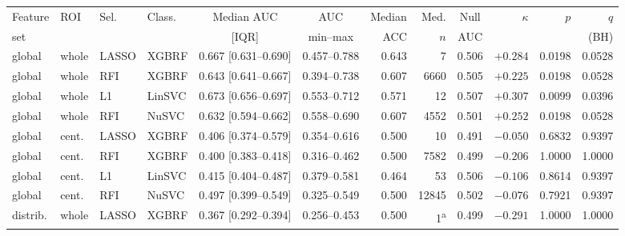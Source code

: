 {\tiny\setlength{\tabcolsep}{3pt}%
\begin{tabular}{llllccrrcrrr}
\toprule
Feature & ROI & Sel. & Class. & Median AUC & AUC & Median & Med. & Null & $\kappa$ & $p$ & $q$ \\
set &  &  &  & [IQR] & min--max & ACC & $n$ & AUC &  &  & (BH) \\
\midrule
global                   & whole & LASSO & XGBRF  & 0.667 [0.631--0.690] & 0.457--0.788 & 0.643 & 7                    & 0.506 & $+0.284$ & 0.0198 & 0.0528 \\
global                   & whole & RFI   & XGBRF  & 0.643 [0.641--0.667] & 0.394--0.738 & 0.607 & 6660                 & 0.505 & $+0.225$ & 0.0198 & 0.0528 \\
global                   & whole & L1    & LinSVC & 0.673 [0.656--0.697] & 0.553--0.712 & 0.571 & 12                   & 0.507 & $+0.307$ & 0.0099 & 0.0396 \\
global                   & whole & RFI   & NuSVC  & 0.632 [0.594--0.662] & 0.558--0.690 & 0.607 & 4552                 & 0.501 & $+0.252$ & 0.0198 & 0.0528 \\
\midrule
global                   & cent. & LASSO & XGBRF  & 0.406 [0.374--0.579] & 0.354--0.616 & 0.500 & 10                   & 0.491 & $-0.050$ & 0.6832 & 0.9397 \\
global                   & cent. & RFI   & XGBRF  & 0.400 [0.383--0.418] & 0.316--0.462 & 0.500 & 7582                 & 0.499 & $-0.206$ & 1.0000 & 1.0000 \\
global                   & cent. & L1    & LinSVC & 0.415 [0.404--0.487] & 0.379--0.581 & 0.464 & 53                   & 0.506 & $-0.106$ & 0.8614 & 0.9397 \\
global                   & cent. & RFI   & NuSVC  & 0.497 [0.399--0.549] & 0.325--0.549 & 0.500 & 12845                & 0.502 & $-0.076$ & 0.7921 & 0.9397 \\
\midrule
distrib.                 & whole & LASSO & XGBRF  & 0.367 [0.292--0.394] & 0.256--0.453 & 0.500 & 1\textsuperscript{a} & 0.499 & $-0.291$ & 1.0000 & 1.0000 \\

\end{tabular}}
